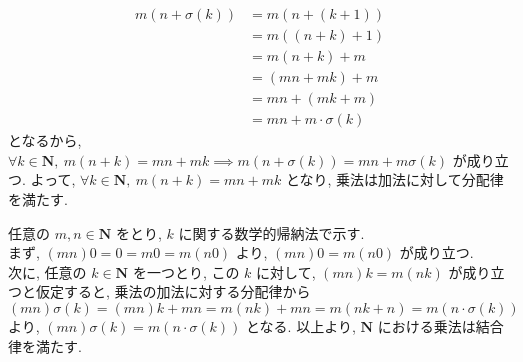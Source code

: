 \begin{nmprob}
{\begin{align*}
m(n + \sigma (k)) &= m(n + (k + 1))\\
&= m((n + k) + 1)\\
&= m(n + k) + m\\
&= (mn + mk) + m\\
&= mn + (mk + m)\\
&= mn + m\cdot \sigma (k)
\end{align*}
となるから, $\forall k \in \bm{N},\ m(n + k) = mn + mk \implies m(n + \sigma (k)) = mn + m\sigma (k)$ が成り立つ.
よって, $\forall k \in \bm{N},\ m(n + k) = mn + mk$ となり, 乗法は加法に対して分配律を満たす.
\item 任意の $m, n\in \bm{N}$ をとり, $k$ に関する数学的帰納法で示す.\\
まず, $(mn)0 = 0 = m0 = m(n0)$ より, $(mn)0 = m(n0)$ が成り立つ.\\
次に, 任意の $k \in \bm{N}$ を一つとり, この $k$ に対して, $(mn)k = m(nk)$ が成り立つと仮定すると, 乗法の加法に対する分配律から
$(mn)\sigma (k) = (mn)k + mn = m(nk) + mn = m(nk + n) = m(n \cdot \sigma (k))$ より, $(mn) \sigma (k) = m(n\cdot \sigma (k))$ となる.
以上より, $\bm{N}$ における乗法は結合律を満たす.
}
\end{nmprob}



